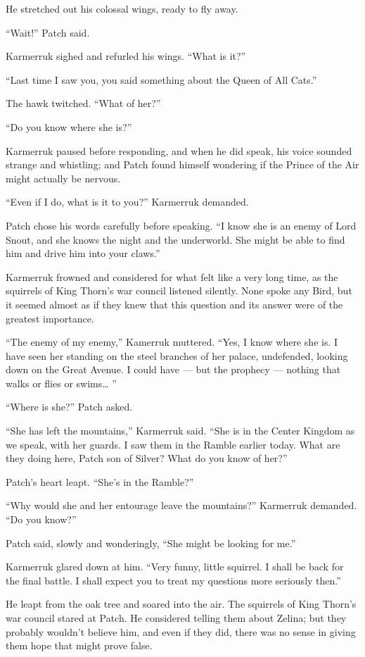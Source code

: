 \documentclass[12pt]{memoir}
\begin{document}
He stretched out his colossal wings, ready to fly away.

“Wait!” Patch said.

Karmerruk sighed and refurled his wings. “What is it?”

“Last time I saw you, you said something about the Queen of All Cats.”

The hawk twitched. “What of her?”

“Do you know where she is?”

Karmerruk paused before responding, and when he did speak, his voice
sounded strange and whistling; and Patch found himself wondering if
the Prince of the Air might actually be nervous.

“Even if I do, what is it to you?” Karmerruk demanded.

Patch chose his words carefully before speaking. “I know she is an
enemy of Lord Snout, and she knows the night and the underworld. She
might be able to find him and drive him into your claws.”

Karmerruk frowned and considered for what felt like a very long time,
as the squirrels of King Thorn’s war council listened silently. None
spoke any Bird, but it seemed almost as if they knew that this
question and its answer were of the greatest importance.

“The enemy of my enemy,” Kamerruk muttered. “Yes, I know where she
is. I have seen her standing on the steel branches of her palace,
undefended, looking down on the Great Avenue. I could have — but the
prophecy — nothing that walks or flies or swims… ”

“Where is she?” Patch asked.

“She has left the mountains,” Karmerruk said. “She is in the Center
Kingdom as we speak, with her guards. I saw them in the Ramble earlier
today. What are they doing here, Patch son of Silver? What do you know
of her?”

Patch’s heart leapt. “She’s in the Ramble?”

“Why would she and her entourage leave the mountains?” Karmerruk
demanded. “Do you know?”

Patch said, slowly and wonderingly, “She might be looking for me.”

Karmerruk glared down at him. “Very funny, little squirrel. I shall be
back for the final battle. I shall expect you to treat my questions
more seriously then.”

He leapt from the oak tree and soared into the air. The squirrels of
King Thorn’s war council stared at Patch. He considered telling them
about Zelina; but they probably wouldn’t believe him, and even if they
did, there was no sense in giving them hope that might prove false.
\end{document}
